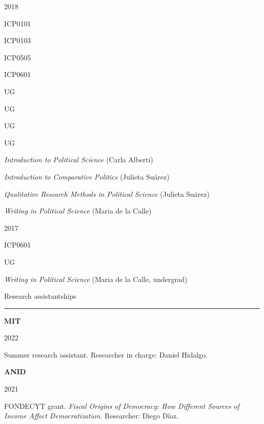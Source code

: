 \documentclass[a4paper, 12pt]{article}
\begin{document}
\begin{multicols}{4}

2018

\columnbreak

ICP0101

ICP0103

ICP0505

ICP0601

\columnbreak

UG

UG

UG

UG

\columnbreak

\textit{Introduction to Political Science} (Carla Alberti)

\textit{Introduction to Comparative Politics} (Julieta Suárez)

\textit{Qualitative Research Methods in Political Science} (Julieta Suárez)

\textit{Writing in Political Science} (Maria de la Calle)

\end{multicols}


\begin{multicols}{4}

2017

\columnbreak

ICP0601

\columnbreak

UG

\columnbreak

\textit{Writing in Political Science} (Maria de la Calle, undergrad)

\end{multicols}




\large Research assistantships
\smallskip
\hrule
\normalsize


\begin{multicols}{3}

\textbf{MIT}

\columnbreak

2022

\columnbreak

Summer research assistant. Researcher in charge: Daniel Hidalgo.

\end{multicols}


\begin{multicols}{3}

\textbf{ANID}

\columnbreak

2021

\columnbreak

FONDECYT grant. \textit{Fiscal Origins of Democracy: How Different Sources of Income Affect Democratization}. Researcher: Diego Díaz.

\end{multicols}
\end{document}
